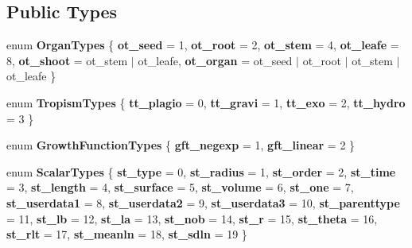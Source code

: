 \subsection*{Public Types}
\begin{DoxyCompactItemize}
\item 
\mbox{\label{classCPlantBox_1_1Organ_a9161d0ffc2c515aa584d795367158482}} 
enum {\bfseries Organ\+Types} \{ \newline
{\bfseries ot\+\_\+seed} = 1, 
{\bfseries ot\+\_\+root} = 2, 
{\bfseries ot\+\_\+stem} = 4, 
{\bfseries ot\+\_\+leafe} = 8, 
\newline
{\bfseries ot\+\_\+shoot} = ot\+\_\+stem $\vert$ ot\+\_\+leafe, 
{\bfseries ot\+\_\+organ} = ot\+\_\+seed $\vert$ ot\+\_\+root $\vert$ ot\+\_\+stem $\vert$ ot\+\_\+leafe
 \}
\item 
\mbox{\label{classCPlantBox_1_1Organ_ada94ab02398ad46f1f377c54459e81f2}} 
enum {\bfseries Tropism\+Types} \{ {\bfseries tt\+\_\+plagio} = 0, 
{\bfseries tt\+\_\+gravi} = 1, 
{\bfseries tt\+\_\+exo} = 2, 
{\bfseries tt\+\_\+hydro} = 3
 \}
\item 
\mbox{\label{classCPlantBox_1_1Organ_a1e30e0dfd37b88380c06a1739e63b985}} 
enum {\bfseries Growth\+Function\+Types} \{ {\bfseries gft\+\_\+negexp} = 1, 
{\bfseries gft\+\_\+linear} = 2
 \}
\item 
\mbox{\label{classCPlantBox_1_1Organ_a72af68e2ca57d20c3a46a7d527f7e1e1}} 
enum {\bfseries Scalar\+Types} \{ \newline
{\bfseries st\+\_\+type} = 0, 
{\bfseries st\+\_\+radius} = 1, 
{\bfseries st\+\_\+order} = 2, 
{\bfseries st\+\_\+time} = 3, 
\newline
{\bfseries st\+\_\+length} = 4, 
{\bfseries st\+\_\+surface} = 5, 
{\bfseries st\+\_\+volume} = 6, 
{\bfseries st\+\_\+one} = 7, 
\newline
{\bfseries st\+\_\+userdata1} = 8, 
{\bfseries st\+\_\+userdata2} = 9, 
{\bfseries st\+\_\+userdata3} = 10, 
{\bfseries st\+\_\+parenttype} = 11, 
\newline
{\bfseries st\+\_\+lb} = 12, 
{\bfseries st\+\_\+la} = 13, 
{\bfseries st\+\_\+nob} = 14, 
{\bfseries st\+\_\+r} = 15, 
\newline
{\bfseries st\+\_\+theta} = 16, 
{\bfseries st\+\_\+rlt} = 17, 
{\bfseries st\+\_\+meanln} = 18, 
{\bfseries st\+\_\+sdln} = 19
 \}
\end{DoxyCompactItemize}
